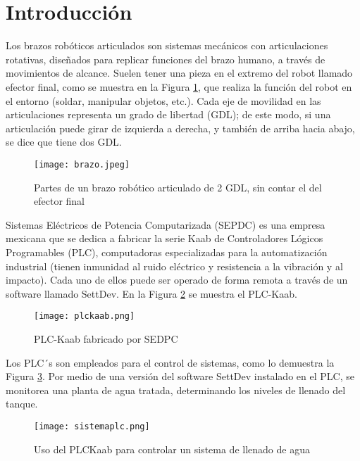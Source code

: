 \section{Introducci\'on}

Los brazos robóticos articulados son sistemas mecánicos con articulaciones rotativas, diseñados para replicar funciones del brazo humano, a través de movimientos de alcance. Suelen tener una pieza en el extremo del robot llamado efector final, como se muestra en la Figura \ref{fig:brazoR}, que realiza la función del robot en el entorno (soldar, manipular objetos, etc.). Cada eje de movilidad en las articulaciones representa un grado de libertad (GDL); de este modo, si una articulación puede girar de izquierda a derecha, y también de arriba hacia abajo, se dice que tiene dos GDL.

\vspace{1cm}

\begin{figure}[htb]
	\centering
	\texttt{[image: brazo.jpeg]}
	\caption{Partes de un brazo robótico articulado de 2 GDL, sin contar el del efector final}
	\label{fig:brazoR}
\end{figure}

\newpage
Sistemas Eléctricos de Potencia Computarizada (SEPDC) es una empresa mexicana que se dedica a fabricar la serie Kaab de Controladores Lógicos Programables (PLC), computadoras especializadas para la automatización industrial (tienen inmunidad al ruido eléctrico y resistencia a la vibración y al impacto). Cada uno de ellos puede ser operado de forma remota a través de un software llamado SettDev. En la Figura \ref{fig:plc} se muestra el PLC-Kaab.

\begin{figure}[htb]
	\centering
	\texttt{[image: plckaab.png]}
	\caption{PLC-Kaab fabricado por SEDPC}
	\label{fig:plc}
\end{figure}

Los PLC´s son empleados para el control de sistemas, como lo demuestra la Figura \ref{fig:siscritico}. Por medio de una versión del software SettDev instalado en el PLC, se monitorea una planta de agua tratada, determinando los niveles de llenado del tanque.

\begin{figure}[htb]
	\centering
	\texttt{[image: sistemaplc.png]}
	\caption{Uso del PLCKaab para controlar un sistema de llenado de agua}
	\label{fig:siscritico}
\end{figure}